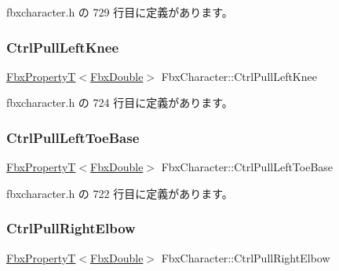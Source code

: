  fbxcharacter.\+h の 729 行目に定義があります。

\mbox{\label{class_fbx_character_a6e03a737caa1d54f2b91a684cacee4c6}} 
\subsubsection{\texorpdfstring{Ctrl\+Pull\+Left\+Knee}{CtrlPullLeftKnee}}
{\footnotesize\ttfamily \hyperlink{class_fbx_property_t}{Fbx\+PropertyT}$<$\hyperlink{fbxtypes_8h_a171e72a1c46fc15c1a6c9c31948c1c5b}{Fbx\+Double}$>$ Fbx\+Character\+::\+Ctrl\+Pull\+Left\+Knee}



 fbxcharacter.\+h の 724 行目に定義があります。

\mbox{\label{class_fbx_character_aa24a9e3263ff172bce43821163c202b9}} 
\subsubsection{\texorpdfstring{Ctrl\+Pull\+Left\+Toe\+Base}{CtrlPullLeftToeBase}}
{\footnotesize\ttfamily \hyperlink{class_fbx_property_t}{Fbx\+PropertyT}$<$\hyperlink{fbxtypes_8h_a171e72a1c46fc15c1a6c9c31948c1c5b}{Fbx\+Double}$>$ Fbx\+Character\+::\+Ctrl\+Pull\+Left\+Toe\+Base}



 fbxcharacter.\+h の 722 行目に定義があります。

\mbox{\label{class_fbx_character_ad5f40480905710f698060eaee25b9f33}} 
\subsubsection{\texorpdfstring{Ctrl\+Pull\+Right\+Elbow}{CtrlPullRightElbow}}
{\footnotesize\ttfamily \hyperlink{class_fbx_property_t}{Fbx\+PropertyT}$<$\hyperlink{fbxtypes_8h_a171e72a1c46fc15c1a6c9c31948c1c5b}{Fbx\+Double}$>$ Fbx\+Character\+::\+Ctrl\+Pull\+Right\+Elbow}



